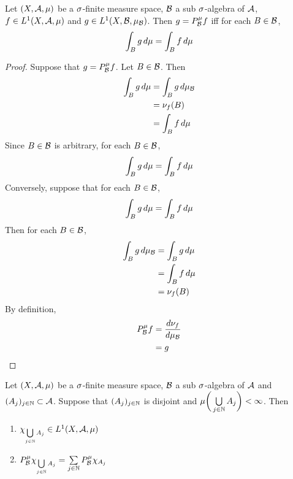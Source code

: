 \documentclass{book}
\begin{document}
	\begin{ex}
		Let $(X, \mathcal{A}, \mu)$ be a $\sigma$-finite measure space, $\mathcal{B}$ a sub $\sigma$-algebra of $\mathcal{A}$, $f \in L^1(X, \mathcal{A}, \mu)$ and $g \in L^1(X, \mathcal{B}, \mu_{\mathcal{B}})$. Then $g = P^{\mu}_{\mathcal{B}}f$ iff for each $B \in \mathcal{B}$, 
		$$\int_B g \, d \mu = \int_B f \, d \mu$$
	\end{ex}

	\begin{proof}
		Suppose that $g = P^{\mu}_{\mathcal{B}}f$. Let $B \in \mathcal{B}$. Then 
		\begin{align*}
			\int_B g \, d \mu 
			& = \int_B g \, d \mu_{\mathcal{B}} \\
			& = \nu_f(B) \\
			& = \int_B f \, d \mu 
		\end{align*}
		Since $B \in \mathcal{B}$ is arbitrary, for each $B \in \mathcal{B}$, 
		$$\int_B g \, d \mu = \int_B f \, d \mu$$ 
		Conversely, suppose that for each $B \in \mathcal{B}$, 
		$$\int_B g \, d \mu = \int_B f \, d \mu$$ 
		Then for each $B \in \mathcal{B}$,
		\begin{align*}
			\int_B g \, d \mu_{\mathcal{B}} 
			& = \int_B g \, d \mu \\
			& = \int_B f \, d \mu \\
			& = \nu_f(B) 
		\end{align*} 
		By definition, 
		\begin{align*}
			P^{\mu}_{\mathcal{B}}f 
			& =  \frac{d \nu_f}{d \mu_{\mathcal{B}}} \\
			& = g
		\end{align*} 
	\end{proof}
	
	\begin{ex}
		Let $(X, \mathcal{A}, \mu)$ be a $\sigma$-finite measure space, $\mathcal{B}$ a sub $\sigma$-algebra of $\mathcal{A}$ and $(A_{j})_{j \in \mathbb{N}} \subset \mathcal{A}$. Suppose that $(A_j)_{j \in \mathbb{N}}$ is disjoint and $\mu \bigg(\bigcup\limits_{j \in \mathbb{N}} A_j \bigg) < \infty$. Then 
		\begin{enumerate}
			\item $\chi_{\bigcup\limits_{j \in \mathbb{N}} A_j} \in L^1(X, \mathcal{A}, \mu)$
			\item $P^{\mu}_{\mathcal{B}} \chi_{\bigcup\limits_{j \in \mathbb{N}} A_j} = \sum\limits_{j \in \mathbb{N}} P^{\mu}_{\mathcal{B}}\chi_{A_j}$
		\end{enumerate}
	\end{ex}
	
\end{document}

